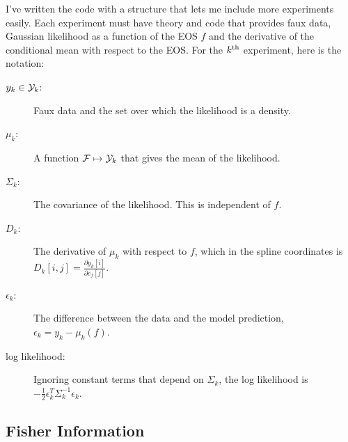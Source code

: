 \documentclass[11pt]{article}
\newcommand{\eos}{f}
\newcommand{\EOS}{{\cal F}}
\newcommand{\data}{y}
\newcommand{\DATA}{{\cal Y}}
\newcommand\cf{c_f}
\begin{document}
I've written the code with a structure that lets me include more
experiments easily.  Each experiment must have theory and code that
provides faux data, Gaussian likelihood as a function of the EOS
$\eos$ and the derivative of the conditional mean with respect to the
EOS.  For the $k^{\rm th}$ experiment, here is the notation:
\begin{description}
\item[$\data_k\in \DATA_k$:] Faux data and the set over which the
  likelihood is a density.
\item[$\mu_k$:] A function $\EOS\mapsto \DATA_k$ that gives the mean
  of the likelihood.
\item[$\Sigma_k$:] The covariance of the likelihood.  This is
  independent of $\eos$.
\item[$D_k$:] The derivative of $\mu_k$ with respect to $\eos$, which
  in the spline coordinates is
  $D_k[i,j] =\frac{\partial \data_k[i]}{\partial \cf[j]}$.
\item[$\epsilon_k$:] The difference between the data and the model
  prediction, $\epsilon_k = \data_k - \mu_k(\eos)$.
\item[log likelihood:] Ignoring constant terms that depend on
  $\Sigma_k$, the log likelihood is $-\frac{1}{2}\epsilon_k^T
  \Sigma_k^{-1} \epsilon_k$.
\end{description}

\subsection{Fisher Information}
\label{sec:fisher-information}
\end{document}
